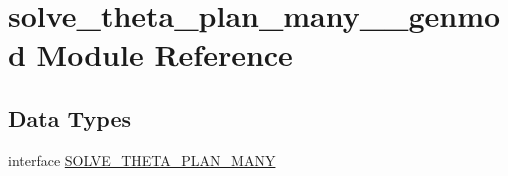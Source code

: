 \hypertarget{namespacesolve__theta__plan__many____genmod}{}\section{solve\+\_\+theta\+\_\+plan\+\_\+many\+\_\+\+\_\+genmod Module Reference}
\label{namespacesolve__theta__plan__many____genmod}
\subsection*{Data Types}
\begin{DoxyCompactItemize}
\item 
interface \mbox{\hyperlink{interfacesolve__theta__plan__many____genmod_1_1_s_o_l_v_e___t_h_e_t_a___p_l_a_n___m_a_n_y}{S\+O\+L\+V\+E\+\_\+\+T\+H\+E\+T\+A\+\_\+\+P\+L\+A\+N\+\_\+\+M\+A\+NY}}
\end{DoxyCompactItemize}
